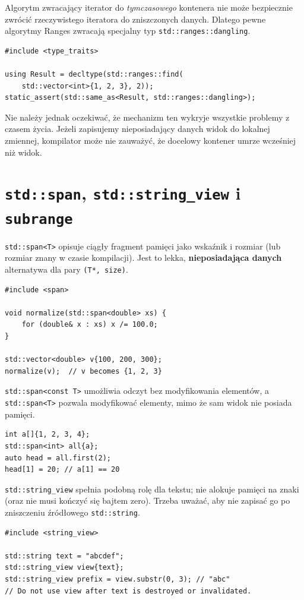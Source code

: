 Algorytm zwracający iterator do \emph{tymczasowego} kontenera nie może
bezpiecznie zwrócić rzeczywistego iteratora do zniszczonych danych.
Dlatego pewne algorytmy Ranges zwracają specjalny typ
\texttt{std::ranges::dangling}.

\begin{lstlisting}
#include <type_traits>

using Result = decltype(std::ranges::find(
    std::vector<int>{1, 2, 3}, 2));
static_assert(std::same_as<Result, std::ranges::dangling>);
\end{lstlisting}

Nie należy jednak oczekiwać, że mechanizm ten wykryje wszystkie
problemy z czasem życia. Jeżeli zapisujemy nieposiadający danych
widok do lokalnej zmiennej, kompilator może nie zauważyć, że docelowy
kontener umrze wcześniej niż widok.

\section{\texttt{std::span}, \texttt{std::string\_view} i \texttt{subrange}}
\label{sec:cpp8-span}

\texttt{std::span<T>} opisuje ciągły fragment pamięci jako wskaźnik
i rozmiar (lub rozmiar znany w czasie kompilacji). Jest to lekka,
\textbf{nieposiadająca danych} alternatywa dla pary
\texttt{(T*, size)}.

\begin{lstlisting}
#include <span>

void normalize(std::span<double> xs) {
    for (double& x : xs) x /= 100.0;
}

std::vector<double> v{100, 200, 300};
normalize(v);  // v becomes {1, 2, 3}
\end{lstlisting}

\texttt{std::span<const T>} umożliwia odczyt bez modyfikowania
elementów, a \texttt{std::span<T>} pozwala modyfikować elementy, mimo
że sam widok nie posiada pamięci.

\begin{lstlisting}
int a[]{1, 2, 3, 4};
std::span<int> all{a};
auto head = all.first(2);
head[1] = 20; // a[1] == 20
\end{lstlisting}

\texttt{std::string\_view} spełnia podobną rolę dla tekstu; nie
alokuje pamięci na znaki (oraz nie musi kończyć się bajtem zero).
Trzeba uważać, aby nie zapisać go po zniszczeniu źródłowego
\texttt{std::string}.

\begin{lstlisting}
#include <string_view>

std::string text = "abcdef";
std::string_view view{text};
std::string_view prefix = view.substr(0, 3); // "abc"
// Do not use view after text is destroyed or invalidated.
\end{lstlisting}

